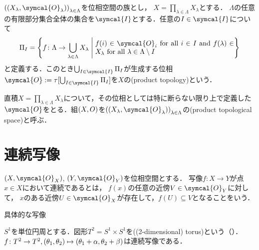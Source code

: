 \documentclass{ltjsbook}
\begin{document}
\begin{thmbox}
\begin{definition}
\({\tuple{\tuple{X_\lambda, \symcal{O}_\lambda}}}_{\lambda \in \Lambda}\)を位相空間の族とし，
\(X = \prod_{\lambda \in \Lambda} X_\lambda\)とする．
\(\Lambda\)の任意の有限部分集合全体の集合を\(\symcal{I}\)とする．任意の\(I \in \symcal{I}\)について
\begin{align*}
    \Pi_I = \left\{ f\colon \Lambda \to \bigcup_{\lambda \in \Lambda} X_\lambda \relmiddle{|} \text{\parbox{7cm}{\(f(i) \in \symcal{O}_i\) for all \(i \in I\) and \(f(\lambda) \in X_\lambda\) for all \(\lambda \in \Lambda \setminus I\)}}\right\}
\end{align*}
と定義する．このとき\(\bigcup_{I \in \symcal{I}} \Pi_I\)が生成する位相\(\symcal{O}:=\tau[\bigcup_{I \in \symcal{I}}\Pi_I]\)を\(X\)の(product topology)という．
\end{definition}
\end{thmbox}

直積\(X = \prod_{\lambda \in \Lambda} X_\lambda\)について，その位相としては特に断らない限り上で定義した\(\symcal{O}\)をとる．組\((X, O)\)を\({\tuple{\tuple{X_\lambda, \symcal{O}_\lambda}}}_{\lambda \in \Lambda}\)の(product topological space)と呼ぶ．

\section{連続写像}
\begin{thmbox}
\begin{definition}
\(\tuple{X, \symcal{O}_{X}}\), \(\tuple{Y, \symcal{O}_{Y}}\)を位相空間とする．
写像\(f\colon X \to Y\)が点\(x \in X\)において連続であるとは，
\(f(x)\)の任意の近傍\(V \in \symcal{O}_Y\)に対して，
\(x\)のある近傍\(U \in \symcal{O}_X\)が存在して，\(f(U) \subseteq V\)となることをいう．
\end{definition}
\end{thmbox}

具体的な写像

\begin{example} \(S^1\)を単位円周とする．図形\(T^2 = S^1 \times S^1\)を((2-dimensional) torus)という（）．
\(f \colon T^2 \to T^2, (\theta_1, \theta_2) \mapsto (\theta_1 + \alpha, \theta_2 + \beta)\)は連続写像である．
\end{example}
\end{document}
